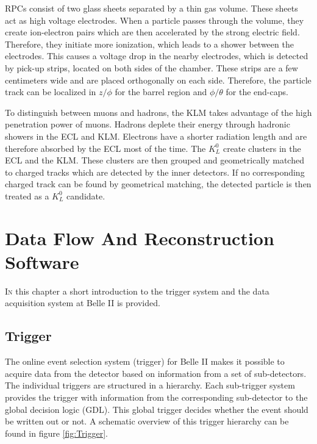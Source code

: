 \documentclass[a4paper,11pt,twosided,final,german,openbib,pdftex,listof=totoc,bibliography=totoc]{scrbook}
\begin{document}
RPCs consist of two glass sheets separated by a thin gas volume. These sheets act as high voltage electrodes. When a particle passes through the volume, they create ion-electron pairs which are then accelerated by the strong electric field. Therefore, they initiate more ionization, which leads to a shower between the electrodes. This causes a voltage drop in the nearby electrodes, which is detected by pick-up strips, located on both sides of the chamber. These strips are a few centimeters wide and are placed orthogonally on each side. Therefore, the particle track can be localized in $z/\phi$ for the barrel region and $\phi/\theta$ for the end-caps.

To distinguish between muons and hadrons, the KLM takes advantage of the high penetration power of muons. Hadrons deplete their energy through hadronic showers in the ECL and KLM. Electrons have a shorter radiation length and are therefore absorbed by the ECL most of the time. The $K_L^0$ create clusters in the ECL and the KLM. These clusters are then grouped and geometrically matched to charged tracks which are detected by the inner detectors. If no corresponding charged track can be found by geometrical matching, the detected particle is then treated as a $K_L^0$ candidate.\cite{B2TR}\cite{KLMS}



\chapter{Data Flow And Reconstruction Software}
\label{sec:TDAS}


\lettrine{I}{n} this chapter a short introduction to the trigger system and the data acquisition system at Belle II is provided.


\section{Trigger}

The online event selection system (trigger) for Belle II makes it possible to acquire data from the detector based on information from a set of sub-detectors. The individual triggers are structured in a hierarchy. Each sub-trigger system provides the trigger with information from the corresponding sub-detector to the global decision logic (GDL). This global trigger decides whether the event should be written out or not. \cite{B2TR} A schematic overview of this trigger hierarchy can be found in figure \ref{fig:Trigger}.
\end{document}
